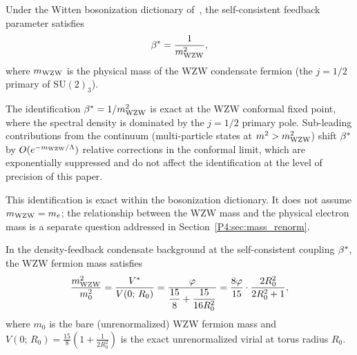 

\begin{theorem}
\label{P4:thm:compton}
Under the Witten bosonization dictionary of~\cite{Paper3}, the
self-consistent feedback parameter satisfies
\[
  \beta^{*} = \frac{1}{m_{\mathrm{WZW}}^2},
\]
where $m_{\mathrm{WZW}}$ is the physical mass of the WZW condensate fermion
(the $j=1/2$ primary of $\mathrm{SU}(2)_3$).
\end{theorem}

\begin{remark}
\label{P4:rem:precision_identification}
The identification $\beta^{*} = 1/m_{\mathrm{WZW}}^2$ is exact at the WZW conformal
fixed point, where the spectral density is dominated by the $j=1/2$
primary pole.  Sub-leading contributions from the continuum
(multi-particle states at $m^2 > m_{\mathrm{WZW}}^2$) shift $\beta^{*}$ by
$O(e^{-m_{\mathrm{WZW}}/\Lambda})$ relative corrections in the conformal limit,
which are exponentially suppressed and do not affect the identification
at the level of precision of this paper.
\end{remark}

\begin{remark}
\label{P4:rem:bosonization_exact}
This identification is exact within the bosonization dictionary.
It does not assume $m_{\mathrm{WZW}} = m_e$; the relationship between the WZW
mass and the physical electron mass is a separate question
addressed in Section~\ref{P4:sec:mass_renorm}.
\end{remark}

\begin{theorem}
\label{P4:thm:mass_renorm}
In the density-feedback condensate background at the self-consistent
coupling $\beta^{*}$, the WZW fermion mass satisfies
\begin{equation}
  \frac{m_{\mathrm{WZW}}^2}{m_0^2}
  = \frac{V^*}{V(0;\,R_0)}
  = \frac{\varphi}{\dfrac{15}{8}+\dfrac{15}{16R_0^2}}
  = \frac{8\varphi}{15}\cdot\frac{2R_0^2}{2R_0^2+1},
  \label{P4:eq:mass_ratio}
\end{equation}
where $m_0$ is the bare (unrenormalized) WZW fermion mass and
$V(0;\,R_0) = \tfrac{15}{8}(1 + \tfrac{1}{2R_0^2})$
is the exact unrenormalized virial at torus radius $R_0$.
\end{theorem}

